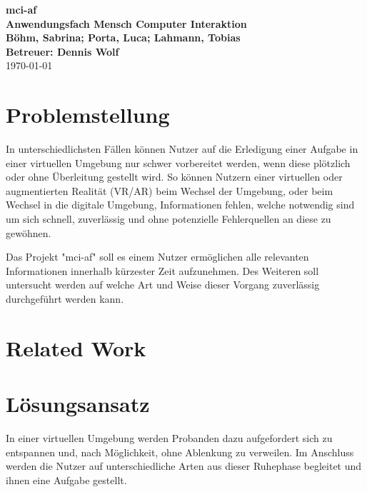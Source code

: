 \documentclass[a4paper, 11pt]{article}
\newcommand{\projectName}{mci-af}
\begin{document}
\begin{center}
	\textbf{\LARGE{\projectName}}\\
    \textbf{\large{Anwendungsfach Mensch Computer Interaktion}}\\
	\vspace{7mm}
    \textbf{\large{Böhm, Sabrina; Porta, Luca; Lahmann, Tobias}}\\
	\textbf{\large{Betreuer: Dennis Wolf}}\\
	\today
\end{center}


\section*{Problemstellung}
In unterschiedlichsten Fällen können Nutzer auf die Erledigung einer Aufgabe in einer virtuellen Umgebung nur schwer vorbereitet werden, wenn diese  plötzlich oder ohne Überleitung gestellt wird. So können Nutzern einer virtuellen oder augmentierten Realität (VR/AR) beim Wechsel der Umgebung, oder beim Wechsel in die digitale Umgebung, Informationen fehlen, welche notwendig sind um sich schnell, zuverlässig und ohne potenzielle Fehlerquellen an diese zu gewöhnen. 

Das Projekt "\projectName" soll es einem Nutzer ermöglichen alle relevanten Informationen innerhalb kürzester Zeit aufzunehmen. Des Weiteren soll untersucht werden auf welche Art und Weise dieser Vorgang zuverlässig durchgeführt werden kann.

\section*{Related Work}
\cite{yumiko2017VisAttention, seppelt2017attend, yeh2001cueReliability, bonanni2005attention, tonnis2005attention, green1995hazard}

\section*{Lösungsansatz}
In einer virtuellen Umgebung werden Probanden dazu aufgefordert sich zu entspannen und, nach Möglichkeit, ohne Ablenkung zu verweilen. Im Anschluss werden die Nutzer auf unterschiedliche Arten aus dieser Ruhephase begleitet und ihnen eine Aufgabe gestellt. 
\end{document}
